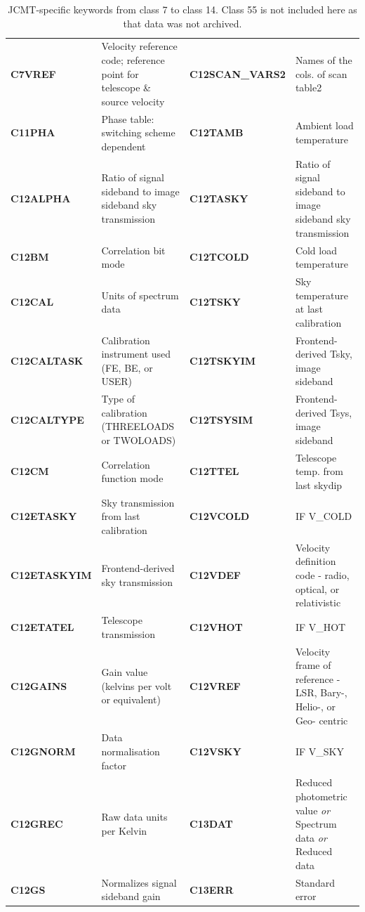 \documentclass[final,authoryear,5p,times,twocolumn]{elsarticle}
\begin{document}
\begin{table}[!ht]
\caption{JCMT-specific keywords from class 7 to class 14. Class 55 is not included here as that data was not archived.}
\label{tab:appa3}
\begin{center}
\begin{tabular}{|lp{2.0in}|lp{2.0in}|}
\hline
\textbf{C7VREF} & Velocity reference code; reference point for telescope \& source velocity & \textbf{C12SCAN\_VARS2} & Names of the cols. of scan table2\\
\textbf{C11PHA} & Phase table: switching scheme dependent & \textbf{C12TAMB} & Ambient load temperature\\
\textbf{C12ALPHA} & Ratio of signal sideband to image sideband sky transmission & \textbf{C12TASKY} & Ratio of signal sideband to image sideband sky transmission\\
\textbf{C12BM} & Correlation bit mode & \textbf{C12TCOLD} & Cold load temperature\\
\textbf{C12CAL} & Units of spectrum data & \textbf{C12TSKY} & Sky temperature at last calibration\\
\textbf{C12CALTASK} & Calibration instrument used (FE, BE, or USER) & \textbf{C12TSKYIM} & Frontend-derived Tsky, image sideband\\
\textbf{C12CALTYPE} & Type of calibration (THREELOADS or TWOLOADS) & \textbf{C12TSYSIM} & Frontend-derived Tsys, image sideband\\
\textbf{C12CM} & Correlation function mode & \textbf{C12TTEL} & Telescope temp. from last skydip\\
\textbf{C12ETASKY} & Sky transmission from last calibration & \textbf{C12VCOLD} & IF V\_COLD\\
\textbf{C12ETASKYIM} & Frontend-derived sky transmission & \textbf{C12VDEF} & Velocity definition code - radio, optical, or relativistic\\
\textbf{C12ETATEL} & Telescope transmission & \textbf{C12VHOT} & IF V\_HOT\\
\textbf{C12GAINS} & Gain value (kelvins per volt or equivalent) & \textbf{C12VREF} & Velocity frame of reference - LSR, Bary-, Helio-, or Geo- centric\\
\textbf{C12GNORM} & Data normalisation factor & \textbf{C12VSKY} & IF V\_SKY\\
\textbf{C12GREC} & Raw data units per Kelvin & \textbf{C13DAT} & Reduced photometric value \emph{or} Spectrum data \emph{or} Reduced data\\
\textbf{C12GS} & Normalizes signal sideband gain & \textbf{C13ERR} & Standard error\\

\end{tabular}
\end{center}
\end{table}
\end{document}
